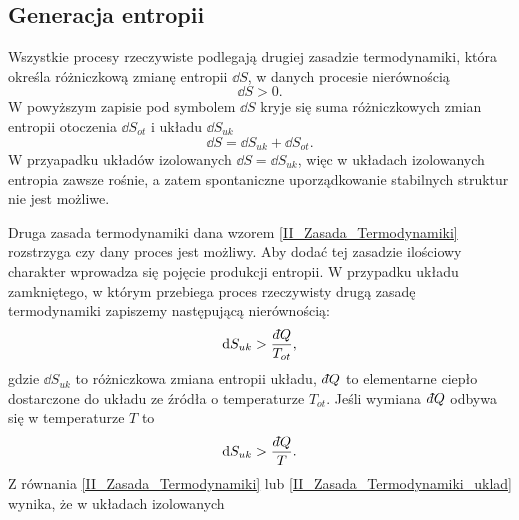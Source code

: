 \documentclass[10pt, a4paper, twoside, onecolumn]{article}
\numberwithin{equation}{section}
\newcommand{\dbar}{d\hspace*{-0.08em}\bar{}\hspace*{0.1em}}
\begin{document}
	\subsection{Generacja entropii}
	Wszystkie procesy rzeczywiste podlegają drugiej zasadzie termodynamiki, która określa różniczkową zmianę entropii \(\dd{S}\), w danych procesie nierównością
	\begin{equation}\label{II_Zasada_Termodynamiki}
		\dd{S}>0.
	\end{equation}
	W powyższym zapisie pod symbolem \(\dd{S}\) kryje się suma różniczkowych zmian entropii otoczenia \(\dd{S_{ot}}\) i układu \(\dd{S_{uk}}\)
	\begin{equation}
		\dd{S}=\dd{S_{uk}}+\dd{S_{ot}}.
	\end{equation}
	W przyapadku układów izolowanych \(\dd{S}=\dd{S_{uk}}\), 
	więc w układach izolowanych entropia zawsze rośnie, a zatem spontaniczne uporządkowanie stabilnych struktur nie jest możliwe. \par
	Druga zasada termodynamiki dana wzorem \eqref{II_Zasada_Termodynamiki} rozstrzyga czy dany proces jest możliwy. Aby dodać tej zasadzie ilościowy charakter wprowadza się pojęcie produkcji entropii. W przypadku układu zamkniętego, w którym przebiega proces rzeczywisty drugą zasadę termodynamiki zapiszemy następującą nierównością: 
	\begin{equation}\label{II_Zasada_Termodynamiki_uklad}
		\dd{S_{uk}}>\frac{\dbar Q}{T_{ot}},
	\end{equation}
	gdzie \(\dd{S_{uk}}\) to różniczkowa zmiana entropii układu, \(\dbar Q\) to elementarne ciepło dostarczone do układu ze źródła o temperaturze \(T_{ot}\). Jeśli wymiana \(\dbar Q\) odbywa się w temperaturze \(T\) to 
	\begin{equation}
		\dd{S_{uk}}>\frac{\dbar Q}{T}.
	\end{equation}
	Z równania \eqref{II_Zasada_Termodynamiki} lub \eqref{II_Zasada_Termodynamiki_uklad} wynika, że w układach izolowanych %
	
\end{document}
